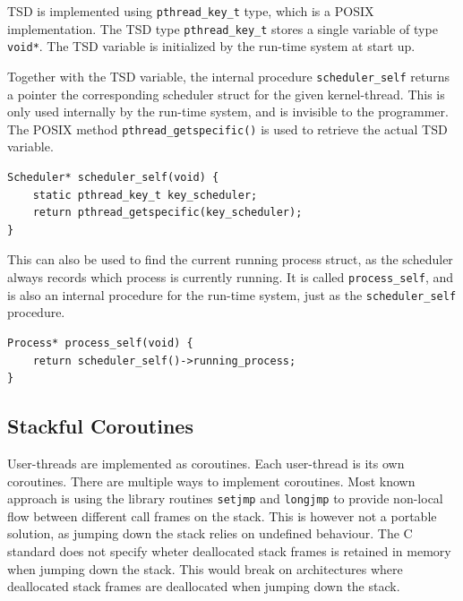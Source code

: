 TSD is implemented using \texttt{pthread\_key\_t} type, which is a POSIX implementation. The TSD type \texttt{pthread\_key\_t} stores a single variable of type \texttt{void*}. The TSD variable is initialized by the run\hyp{}time system at start up.

Together with the TSD variable, the internal procedure \texttt{scheduler\_self} returns a pointer the corresponding scheduler struct for the given kernel\hyp{}thread. This is only used internally by the run\hyp{}time system, and is invisible to the programmer. The POSIX method \texttt{pthread\_getspecific()} is used to retrieve the actual TSD variable.

\noindent\begin{minipage}{\textwidth}
\begin{lstlisting}[style={CustomC},caption={Procedure to find the scheduler for a given kernel\hyp{}trhead}]
Scheduler* scheduler_self(void) {
    static pthread_key_t key_scheduler;
    return pthread_getspecific(key_scheduler);
}
\end{lstlisting}
\end{minipage}

This can also be used to find the current running process struct, as the scheduler always records which process is currently running. It is called \texttt{process\_self}, and is also an internal procedure for the run\hyp{}time system, just as the \texttt{scheduler\_self} procedure.

\noindent\begin{minipage}{\textwidth}
\begin{lstlisting}[style={CustomC},caption={Procedure to find the current running process}]
Process* process_self(void) {
    return scheduler_self()->running_process;
}
\end{lstlisting}
\end{minipage}


\subsection{Stackful Coroutines}
\label{subsec:stackful_coroutines_impl}

User\hyp{}threads are implemented as coroutines. Each user\hyp{}thread is its own coroutines. There are multiple ways to implement coroutines. Most known approach is using the library routines \texttt{setjmp} and \texttt{longjmp} to provide non\hyp{}local flow between different call frames on the stack. This is however not a portable solution, as jumping down the stack relies on undefined behaviour. The C standard does not specify wheter deallocated stack frames is retained in memory when jumping down the stack. This would break on architectures where deallocated stack frames are deallocated when jumping down the stack.

